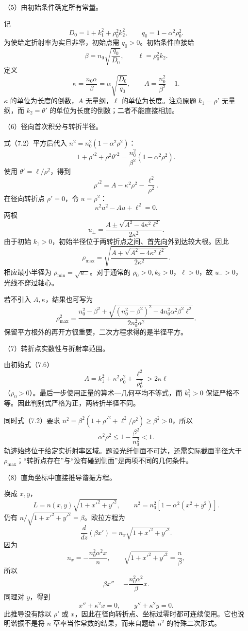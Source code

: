 \documentclass[12pt,a4paper,fontset=fandol]{ctexart}
\begin{document}
（5）由初始条件确定所有常量。

记 \[
D_0=1+k_1^2+\rho_0^2k_2^2,\qquad
q_0=1-\alpha^2\rho_0^2.
\] 为使给定折射率为实且非零，初始点需 \(q_0>0\)。初始条件直接给 \[
\boxed{\beta=n_0\sqrt{\frac{q_0}{D_0}},
\qquad \ell=\rho_0^2k_2.}\tag{7.5}
\] 定义 \[
\kappa=\frac{n_0\alpha}{\beta}
=\alpha\sqrt{\frac{D_0}{q_0}},
\qquad
A=\frac{n_0^2}{\beta^2}-1.
\] \(\kappa\) 的单位为长度的倒数，\(A\) 无量纲，\(\ell\)
的单位为长度。注意原题 \(k_1=\rho'\) 无量纲，而 \(k_2=\theta'\)
的单位为长度的倒数；二者不能直接相加。

（6）径向首次积分与转折半径。

式（7.2）平方后代入 \(n^2=n_0^2(1-\alpha^2\rho^2)\)： \[
1+\rho'^2+\rho^2\theta'^2
=\frac{n_0^2}{\beta^2}(1-\alpha^2\rho^2).
\] 使用 \(\theta'=\ell/\rho^2\)，得到 \[
\boxed{\rho'^2=A-\kappa^2\rho^2-\frac{\ell^2}{\rho^2}.}\tag{7.6}
\] 在径向转折点 \(\rho'=0\)，令 \(u=\rho^2\)： \[
\kappa^2u^2-Au+\ell^2=0.
\] 两根 \[
u_\pm=\frac{A\pm\sqrt{A^2-4\kappa^2\ell^2}}{2\kappa^2}.
\] 由于初始
\(k_1>0\)，初始半径位于两转折点之间、首先向外到达较大根。因此 \[
\boxed{\rho_{\max}=
\sqrt{\frac{A+\sqrt{A^2-4\kappa^2\ell^2}}
{2\kappa^2}}.}\tag{7.7}
\] 相应最小半径为 \(\rho_{\min}=\sqrt{u_-}\)。对于通常的
\(\rho_0>0,k_2>0\)，\(\ell>0\)，故 \(u_->0\)，光线不穿过轴心。

若不引入 \(A,\kappa\)，结果也可写为 \[
\rho_{\max}^2=
\frac{n_0^2-\beta^2+
\sqrt{(n_0^2-\beta^2)^2-4n_0^2\alpha^2\beta^2\ell^2}}
{2n_0^2\alpha^2}.
\] 保留平方根外的再开方很重要，二次方程求得的是半径平方。

（7）转折点实数性与折射率范围。

由初始式（7.6） \[
A=k_1^2+\kappa^2\rho_0^2+\frac{\ell^2}{\rho_0^2}
>2\kappa\ell
\] （\(\rho_0>0\)）。最后一步使用正量的算术---几何平均不等式，而
\(k_1^2>0\) 保证严格不等。因此判别式严格为正，两转折半径不同。

同时式（7.2）要求
\(n^2=\beta^2(1+\rho'^2+\ell^2/\rho^2)\ge\beta^2>0\)，所以 \[
\alpha^2\rho^2\le1-\frac{\beta^2}{n_0^2}<1.
\]
轨迹始终位于给定实折射率区域。题设光纤侧面不可达，还需实际截面半径大于
\(\rho_{\max}\)；``转折点存在''与``没有碰到侧面''是两项不同的几何条件。

（8）直角坐标中直接推导谐振方程。

换成 \(x,y\)， \[
L=n(x,y)\sqrt{1+x'^2+y'^2},
\qquad n^2=n_0^2[1-\alpha^2(x^2+y^2)].
\] 仍有 \(n/\sqrt{1+x'^2+y'^2}=\beta\)。欧拉方程为 \[
\frac{d}{dz}(\beta x')=n_x\sqrt{1+x'^2+y'^2}.
\] 因为 \[
n_x=-\frac{n_0^2\alpha^2x}{n},\qquad
\sqrt{1+x'^2+y'^2}=\frac n\beta,
\] 所以 \[
\beta x''=-\frac{n_0^2\alpha^2}{\beta}x.
\] 同理对 \(y\)，得到 \[
\boxed{x''+\kappa^2x=0,\qquad
y''+\kappa^2y=0.}\tag{7.8}
\] 此推导没有除以 \(\rho'\) 或
\(x\)，因此在径向转折点、坐标过零时都可连续使用。它也说明谐振不是将
\(n\) 草率当作常数的结果，而来自题给 \(n^2\) 的特殊二次形式。
\end{document}

